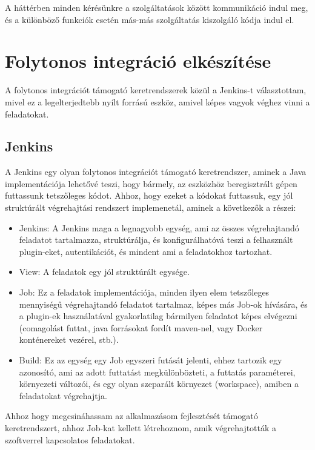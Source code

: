 \documentclass[11pt,magyar,a4paper,twoside,]{report}
\providecommand{\tightlist}{%
  \setlength{\itemsep}{0pt}\setlength{\parskip}{0pt}}
\begin{document}
A háttérben minden kérésünkre a szolgáltatások között kommunikáció indul
meg, és a különböző funkciók esetén más-más szolgáltatás kiszolgáló
kódja indul el.

\section{Folytonos integráció
elkészítése}\label{folytonos-integruxe1ciuxf3-elkuxe9szuxedtuxe9se}

A folytonos integrációt támogató keretrendszerek közül a Jenkins-t
választottam, mivel ez a legelterjedtebb nyílt forrású eszköz, amivel
képes vagyok véghez vinni a feladatokat.

\subsection{Jenkins}\label{jenkins}

A Jenkins egy olyan folytonos integrációt támogató keretrendszer, aminek
a Java implementációja lehetővé teszi, hogy bármely, az eszközhöz
beregisztrált gépen futtassunk tetszőleges kódot. Ahhoz, hogy ezeket a
kódokat futtassuk, egy jól struktúrált végrehajtási rendszert
implemenetál, aminek a következők a részei:

\begin{itemize}
\tightlist
\item
  Jenkins: A Jenkins maga a legnagyobb egység, ami az összes
  végrehajtandó feladatot tartalmazza, struktúrálja, és konfigurálhatóvá
  teszi a felhasznált plugin-eket, autentikációt, és mindent ami a
  feladatokhoz tartozhat.
\item
  View: A feladatok egy jól struktúrált egysége.
\item
  Job: Ez a feladatok implementációja, minden ilyen elem tetszőleges
  mennyiségű végrehajtandó feladatot tartalmaz, képes más Job-ok
  hívására, és a plugin-ek használatával gyakorlatilag bármilyen
  feladatot képes elvégezni (comagolást futtat, java forrásokat fordít
  maven-nel, vagy Docker konténereket vezérel, stb.).
\item
  Build: Ez az egység egy Job egyszeri futását jelenti, ehhez tartozik
  egy azonosító, ami az adott futtatást megkülönbözteti, a futtatás
  paraméterei, környezeti változói, és egy olyan szeparált környezet
  (workspace), amiben a feladatokat végrehajtja.
\end{itemize}

Ahhoz hogy megcsináhassam az alkalmazásom fejlesztését támogató
keretrendszert, ahhoz Job-kat kellett létrehoznom, amik végrehajtották a
szoftverrel kapcsolatos feladatokat.
\end{document}
